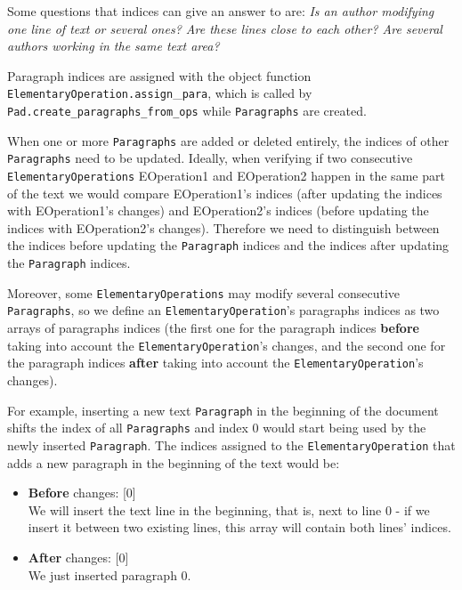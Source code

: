       Some questions that indices can give an answer to are: \textit{Is an author modifying one line of text or several ones? Are these lines close to each other? Are several authors working in the same  text area?}
      
      Paragraph indices are assigned with the object function \texttt{ElementaryOperation.assign}\_\texttt{para}, which is called by \texttt{Pad.create\_paragraphs\_from\_ops} while \texttt{Paragraphs} are created.
      
      When one or more \texttt{Paragraphs} are added or deleted entirely, the indices of other \texttt{Paragraphs} need to be updated. Ideally, when verifying if two consecutive \texttt{ElementaryOperations} EOperation1 and EOperation2 happen in the same part of the text we would compare EOperation1's indices (after updating the indices with EOperation1's changes) and EOperation2's indices (before updating the indices with EOperation2's changes). Therefore we need to distinguish between the indices before updating the \texttt{Paragraph} indices and the indices after updating the \texttt{Paragraph} indices.
      
      Moreover, some \texttt{ElementaryOperations} may modify several consecutive \texttt{Paragraphs}, so we define an \texttt{ElementaryOperation}'s paragraphs indices as two arrays of paragraphs indices (the first one for the paragraph indices \textbf{before} taking into account the \texttt{ElementaryOperation}'s changes, and the second one for the paragraph indices \textbf{after} taking into account the \texttt{ElementaryOperation}'s changes).
      
      For example, inserting a new text \texttt{Paragraph} in the beginning of the document shifts the index of all \texttt{Paragraphs} and index 0 would start being used by the newly inserted \texttt{Paragraph}. The indices assigned to the  \texttt{ElementaryOperation} that adds a new paragraph in the beginning of the text would be:
      \begin{itemize}
          \item \textbf{Before} changes: [0]\\
          We will insert the text line in the beginning, that is, next to line 0 - if we insert it between two existing lines, this array will contain both lines' indices.
          \item \textbf{After} changes: [0]\\
          We just inserted paragraph 0.
      \end{itemize}
      
